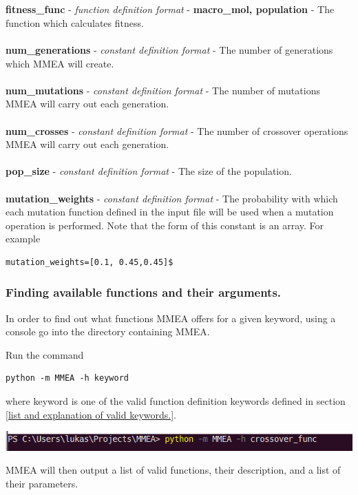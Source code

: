 \documentclass[12pt]{article}
\begin{document}
\\
\\
\textbf{fitness\_func} - \textit{function definition format} - \textbf{macro\_mol, population} - The function which calculates fitness.
\\
\\
\textbf{num\_generations} - \textit{constant definition format} - The number of generations which MMEA will create.
\\
\\
\textbf{num\_mutations} - \textit{constant definition format} - The number of mutations MMEA will carry out each generation.
\\
\\
\textbf{num\_crosses} - \textit{constant definition format} - The number of crossover operations MMEA will carry out each generation.
\\
\\
\textbf{pop\_size} - \textit{constant definition format} - The size of the population.
\\
\\
\textbf{mutation\_weights} - \textit{constant definition format} - The probability with which each mutation function defined in the input file will be used when a mutation operation is performed. Note that the form of this constant is an array. For example
\begin{verbatim}
mutation_weights=[0.1, 0.45,0.45]$
\end{verbatim}

\subsubsection{Finding available functions and their arguments.}
\label{Finding available functions and their arguments.}
In order to find out what functions MMEA offers for a given keyword, using a console go into the directory containing MMEA. 

Run the command 
\begin{verbatim}
python -m MMEA -h keyword
\end{verbatim}
where keyword is one of the valid function definition keywords defined in section \ref{list and explanation of valid keywords.}.

\includegraphics[scale=1]{console1}

MMEA will then output a list of valid functions, their description, and a list of their parameters.
\end{document}
